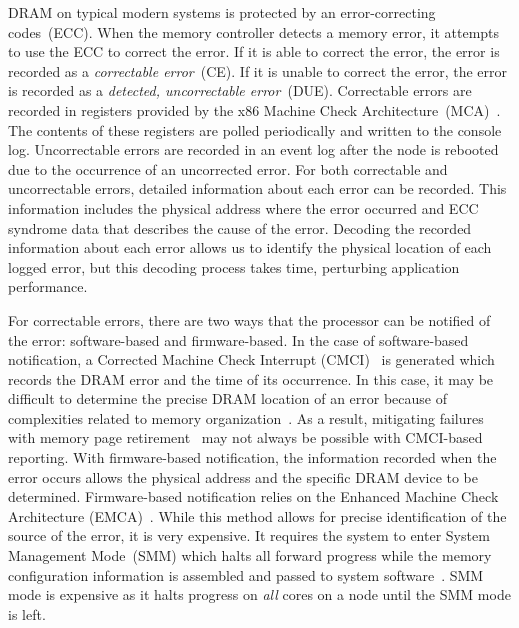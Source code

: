 
DRAM on typical modern systems is protected by an error-correcting
codes~(ECC).  When the memory controller detects a memory error, it attempts to
use the ECC to correct the error.  If it is able to correct the error, the
error is recorded as a \emph{correctable error}~(CE).  If it is unable to
correct the error, the error is recorded as a \emph{detected, uncorrectable
error}~(DUE).  Correctable errors are recorded in registers provided by the x86
Machine Check Architecture~(MCA)~\cite{AMD,IntelGuide}.  The contents of these
registers are polled periodically and written to the console log.
Uncorrectable errors are recorded in an event log after the node is rebooted
due to the occurrence of an uncorrected error.  For both correctable and
uncorrectable errors, detailed information about each error can be recorded.
This information includes the physical address where the error occurred and ECC
syndrome data that describes the cause of the error.  Decoding the recorded
information about each error allows us to identify the physical location of
each logged error, but this decoding process takes time, perturbing application
performance.

For correctable errors, there are two ways that the processor can be notified of
the error: software-based and firmware-based.  In the case of software-based
notification, a Corrected Machine Check Interrupt
(CMCI)~\cite{IntelGuide,Gottscho:2017:Measuring} is generated which records
the DRAM error and the time of its occurrence. In this case, it may be difficult
to determine the precise DRAM location of an error because of complexities related
to memory organization~\cite{Gottscho:2017:Measuring}.  As a result, mitigating
failures with memory page retirement~\cite{Tang:2006:Assessment} may not always
be possible with CMCI-based reporting.  With firmware-based notification, the
information recorded when the error occurs allows the physical address and the
specific DRAM device to be determined.  Firmware-based notification relies on the
Enhanced Machine Check Architecture (EMCA)~\cite{MCAEnhancements}.  While this
method allows for precise identification of the source of the error, it is very
expensive.  It requires the system to enter System Management Mode~(SMM) which halts
all forward progress while the memory configuration information is assembled and
passed to system software~\cite{Gottscho:2017:Measuring}. SMM mode is expensive
as it halts progress on \emph{all} cores on a node until the SMM mode is left.

